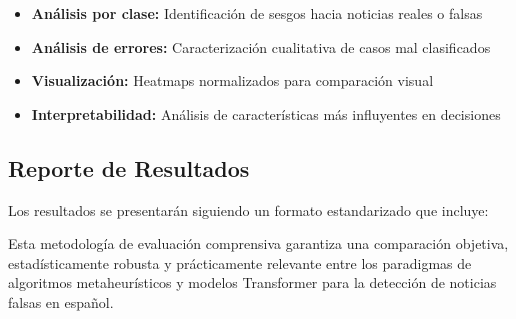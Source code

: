 \begin{itemize}
    \item \textbf{Análisis por clase:} Identificación de sesgos hacia noticias reales o falsas
    \item \textbf{Análisis de errores:} Caracterización cualitativa de casos mal clasificados
    \item \textbf{Visualización:} Heatmaps normalizados para comparación visual
    \item \textbf{Interpretabilidad:} Análisis de características más influyentes en decisiones
\end{itemize}

\subsection{Reporte de Resultados}

Los resultados se presentarán siguiendo un formato estandarizado que incluye:

\begin{table}[htbp]
\centering
{}
\caption{Estructura del reporte de resultados comparativo.}
\label{tab:estructura_reporte}
\end{table}

Esta metodología de evaluación comprensiva garantiza una comparación objetiva, estadísticamente robusta y prácticamente relevante entre los paradigmas de algoritmos metaheurísticos y modelos Transformer para la detección de noticias falsas en español.

